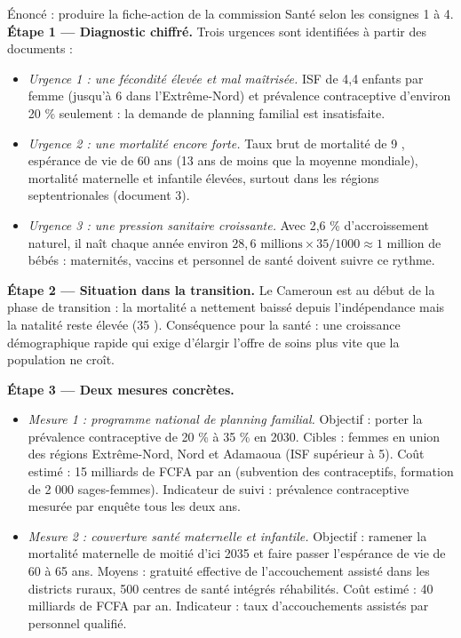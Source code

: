 \documentclass[11pt]{article}
\begin{document}
\begin{exoresolu}
Énoncé : produire la fiche-action de la commission Santé selon les consignes 1 à 4.
\tcblower
\textbf{Étape 1 — Diagnostic chiffré.} Trois urgences sont identifiées à partir des documents :
\begin{itemize}
\item \emph{Urgence 1 : une fécondité élevée et mal maîtrisée.} ISF de 4,4 enfants par femme (jusqu'à 6 dans l'Extrême-Nord) et prévalence contraceptive d'environ 20 \% seulement : la demande de planning familial est insatisfaite.
\item \emph{Urgence 2 : une mortalité encore forte.} Taux brut de mortalité de 9 \textperthousand, espérance de vie de 60 ans (13 ans de moins que la moyenne mondiale), mortalité maternelle et infantile élevées, surtout dans les régions septentrionales (document 3).
\item \emph{Urgence 3 : une pression sanitaire croissante.} Avec 2,6 \% d'accroissement naturel, il naît chaque année environ $28{,}6 \text{ millions} \times 35/1000 \approx 1$ million de bébés : maternités, vaccins et personnel de santé doivent suivre ce rythme.
\end{itemize}

\textbf{Étape 2 — Situation dans la transition.} Le Cameroun est au début de la phase de transition : la mortalité a nettement baissé depuis l'indépendance mais la natalité reste élevée (35 \textperthousand). Conséquence pour la santé : une croissance démographique rapide qui exige d'élargir l'offre de soins plus vite que la population ne croît.

\textbf{Étape 3 — Deux mesures concrètes.}
\begin{itemize}
\item \emph{Mesure 1 : programme national de planning familial.} Objectif : porter la prévalence contraceptive de 20 \% à 35 \% en 2030. Cibles : femmes en union des régions Extrême-Nord, Nord et Adamaoua (ISF supérieur à 5). Coût estimé : 15 milliards de FCFA par an (subvention des contraceptifs, formation de 2 000 sages-femmes). Indicateur de suivi : prévalence contraceptive mesurée par enquête tous les deux ans.
\item \emph{Mesure 2 : couverture santé maternelle et infantile.} Objectif : ramener la mortalité maternelle de moitié d'ici 2035 et faire passer l'espérance de vie de 60 à 65 ans. Moyens : gratuité effective de l'accouchement assisté dans les districts ruraux, 500 centres de santé intégrés réhabilités. Coût estimé : 40 milliards de FCFA par an. Indicateur : taux d'accouchements assistés par personnel qualifié.
\end{itemize}


\end{exoresolu}
\end{document}
